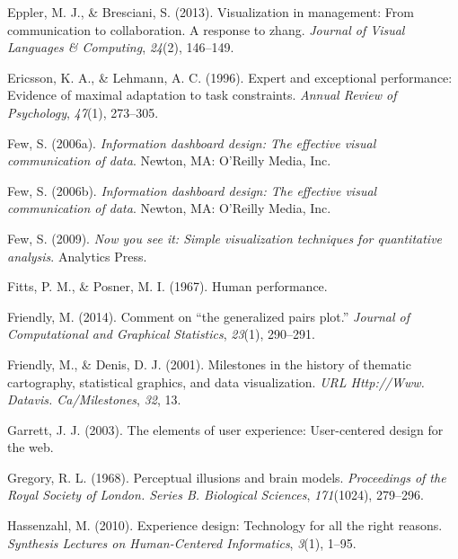 \documentclass[print]{nuthesis}
\newlength{\cslhangindent}
\newenvironment{CSLReferences}[2]%
{\setlength{\parindent}{0pt}%
\everypar{\setlength{\hangindent}{\cslhangindent}}\ignorespaces}%
{\par}
\begin{document}
\begin{CSLReferences}{1}{0}
\leavevmode{}%
Eppler, M. J., \& Bresciani, S. (2013). Visualization in management: From communication to collaboration. A response to zhang. \emph{Journal of Visual Languages \& Computing}, \emph{24}(2), 146--149.

\leavevmode{}%
Ericsson, K. A., \& Lehmann, A. C. (1996). Expert and exceptional performance: Evidence of maximal adaptation to task constraints. \emph{Annual Review of Psychology}, \emph{47}(1), 273--305.

\leavevmode{}%
Few, S. (2006a). \emph{Information dashboard design: The effective visual communication of data}. Newton, MA: O'Reilly Media, Inc.

\leavevmode{}%
Few, S. (2006b). \emph{Information dashboard design: The effective visual communication of data}. Newton, MA: O'Reilly Media, Inc.

\leavevmode{}%
Few, S. (2009). \emph{Now you see it: Simple visualization techniques for quantitative analysis}. Analytics Press.

\leavevmode{}%
Fitts, P. M., \& Posner, M. I. (1967). Human performance.

\leavevmode{}%
Friendly, M. (2014). Comment on {``the generalized pairs plot.''} \emph{Journal of Computational and Graphical Statistics}, \emph{23}(1), 290--291.

\leavevmode{}%
Friendly, M., \& Denis, D. J. (2001). Milestones in the history of thematic cartography, statistical graphics, and data visualization. \emph{URL Http://Www. Datavis. Ca/Milestones}, \emph{32}, 13.

\leavevmode{}%
Garrett, J. J. (2003). The elements of user experience: User-centered design for the web.

\leavevmode{}%
Gregory, R. L. (1968). Perceptual illusions and brain models. \emph{Proceedings of the Royal Society of London. Series B. Biological Sciences}, \emph{171}(1024), 279--296.

\leavevmode{}%
Hassenzahl, M. (2010). Experience design: Technology for all the right reasons. \emph{Synthesis Lectures on Human-Centered Informatics}, \emph{3}(1), 1--95.


\end{CSLReferences}
\end{document}
